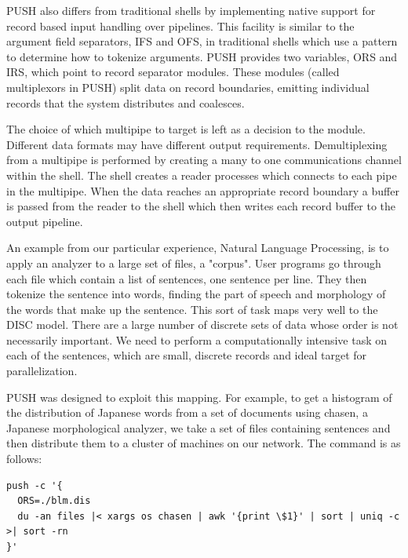 \documentclass[11pt, letterpaper]{article}
\begin{document}
PUSH also differs from traditional shells by implementing native support for 
record based input handling over pipelines. This facility is similar to the 
argument field separators, IFS and OFS, in traditional shells which use a 
pattern to determine how to tokenize arguments. PUSH provides two variables, 
ORS and IRS, which point to record separator modules. These modules 
(called multiplexors in PUSH) split data on record boundaries, emitting 
individual records that the system distributes and coalesces. 

The choice of which multipipe to target is left as a decision to the module. 
Different data formats may have different output requirements. 
Demultiplexing from a multipipe is performed by creating a many to one 
communications channel within the shell. The shell creates a reader processes 
which connects to each pipe in the multipipe. When the data reaches an 
appropriate record boundary a buffer is passed from the reader to the shell 
which then writes each record buffer to the output pipeline. 

An example from our particular experience, Natural Language Processing, is 
to apply an analyzer to a large set of files, a "corpus". User programs go 
through each file which contain a list of sentences, one sentence per line. 
They then tokenize the sentence into words, finding the part of speech and 
morphology of the words that make up the sentence.
This sort of task maps very well to the DISC model. There are a large number of 
discrete sets of data whose order is not necessarily important. We need to 
perform a computationally intensive task on each of the sentences, which are 
small, discrete records and ideal target for parallelization. 

PUSH was designed to exploit this mapping. For example, to get a histogram of 
the distribution of Japanese words from a set of documents using chasen, 
a Japanese morphological analyzer, we take a set of files containing sentences 
and then distribute them to a cluster of machines on our network. The command 
is as follows:
\begin{verbatim}
push -c '{
  ORS=./blm.dis
  du -an files |< xargs os chasen | awk '{print \$1}' | sort | uniq -c >| sort -rn
}'
\end{verbatim}
\end{document}
